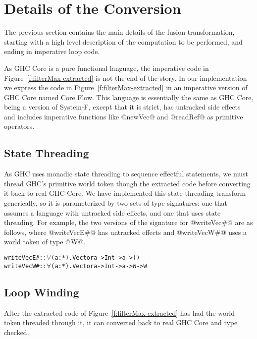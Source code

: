 
\section{Details of the Conversion}
\label{s:Conversion}

The previous section contains the main details of the fusion transformation, starting with a high level description of the computation to be performed, and ending in imperative loop code.

As GHC Core is a pure functional language, the imperative code in Figure~\ref{f:filterMax-extracted} is not the end of the story. In our implementation we express the code in Figure~\ref{f:filterMax-extracted} in an imperative version of GHC Core named Core Flow. This language is essentially the same as GHC Core, being a version of System-F, except that it is strict, has untracked side effects and includes imperative functions like @newVec@ and @readRef@ as primitive operators.


\subsection{State Threading}
As GHC uses monadic state threading to sequence effectful statements, we must thread GHC's primitive world token though the extracted code before converting it back to real GHC Core. We have implemented this state threading transform generically, so it is parameterized by two sets of type signatures: one that assumes a language with untracked side effects, and one that uses state threading. For example, the two versions of the signature for @writeVec#@ are as follows, where @writeVecE#@ has untracked effects and @writeVecW#@ uses a world token of type @W@.

\begin{alltt}
writeVecE# :: \(\forall\)(a:*). Vector a -> Int -> a -> ()
writeVecW# :: \(\forall\)(a:*). Vector a -> Int -> a -> W -> W
\end{alltt}


\subsection{Loop Winding}
\label{s:LoopWinding}
After the extracted code of Figure~\ref{f:filterMax-extracted} has had the world token threaded through it, it can converted back to real GHC Core and type checked. 

